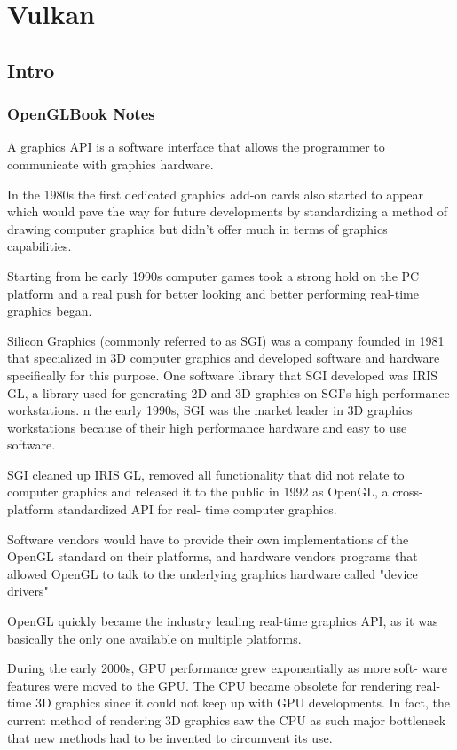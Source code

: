 \chapter{Vulkan}

\section{Intro}

\subsection{OpenGLBook Notes}

A graphics API is a software interface that allows the programmer to communicate
with graphics hardware.

In the 1980s the first dedicated graphics add-on cards also started to appear
which would pave the way for future developments by standardizing a
method of drawing computer graphics but didn't offer much in terms of graphics
capabilities.

Starting from he early 1990s computer games took a strong hold on the PC
platform and a real push for better looking and better performing real-time
graphics began.

Silicon Graphics (commonly referred to as SGI) was a company founded
in 1981 that specialized in 3D computer graphics and developed software and
hardware specifically for this purpose.
One software library that SGI developed was IRIS GL,
a library used for generating 2D and 3D graphics on SGI's high performance
workstations.
n the early 1990s, SGI was the market leader in 3D graphics workstations
because of their high performance hardware and easy to use software.

SGI cleaned up IRIS GL, removed all functionality that
did not relate to computer graphics and released it to the public in 1992 as
OpenGL, a cross-platform standardized API for real-
time computer graphics.

Software vendors would have to provide their own implementations of the
OpenGL standard on their platforms, and hardware vendors programs that
allowed OpenGL to talk to the underlying graphics hardware called "device
drivers"

OpenGL quickly became the industry leading real-time graphics API, as it
was basically the only one available on multiple platforms.

During the early 2000s, GPU performance grew exponentially as more soft-
ware features were moved to the GPU. The CPU became obsolete for rendering
real-time 3D graphics since it could not keep up with GPU developments. In
fact, the current method of rendering 3D graphics saw the CPU as such major
bottleneck that new methods had to be invented to circumvent its use.

